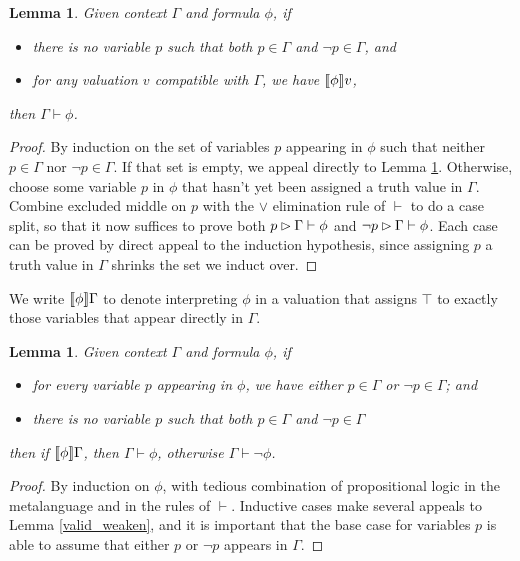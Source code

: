 \documentclass{amsbook}
\newtheorem{lemma}[theorem]{Lemma}
\theoremstyle{definition}
\theoremstyle{remark}
\numberwithin{section}{chapter}
\numberwithin{equation}{chapter}
\begin{document}
\begin{lemma}\label{interp_valid'}
  Given context $\Gamma$ and formula $\phi$, if
  \begin{itemize}
  \item there is no variable $p$ such that both $p \in \Gamma$ and $\neg p \in \Gamma$, and
  \item for any valuation $v$ compatible with $\Gamma$, we have ${\left \llbracket \phi \right \rrbracket}v$,
  \end{itemize}
  then $\Gamma \vdash \phi$.
\end{lemma}
\begin{proof}
  By induction on the set of variables $p$ appearing in $\phi$ such that neither $p \in \Gamma$ nor $\neg p \in \Gamma$.
  If that set is empty, we appeal directly to Lemma \ref{interp_valid''}.
  Otherwise, choose some variable $p$ in $\phi$ that hasn't yet been assigned a truth value in $\Gamma$.
  Combine excluded middle on $p$ with the $\lor$ elimination rule of $\vdash$ to do a case split, so that it now suffices to prove both $p \rhd \Gamma \vdash \phi$ and $\neg p \rhd \Gamma \vdash \phi$.
  Each case can be proved by direct appeal to the induction hypothesis, since assigning $p$ a truth value in $\Gamma$ shrinks the set we induct over.
\end{proof}

We write ${\left \llbracket \phi \right \rrbracket}\Gamma$ to denote interpreting $\phi$ in a valuation that assigns $\top$ to exactly those variables that appear directly in $\Gamma$.

\begin{lemma}\label{interp_valid''}
  Given context $\Gamma$ and formula $\phi$, if
  \begin{itemize}
  \item for every variable $p$ appearing in $\phi$, we have either $p \in \Gamma$ or $\neg p \in \Gamma$; and
  \item there is no variable $p$ such that both $p \in \Gamma$ and $\neg p \in \Gamma$
  \end{itemize}
  then if ${\left \llbracket \phi \right \rrbracket}\Gamma$, then $\Gamma \vdash \phi$, otherwise $\Gamma \vdash \neg \phi$.
\end{lemma}
\begin{proof}
  By induction on $\phi$, with tedious combination of propositional logic in the metalanguage and in the rules of $\vdash$.
  Inductive cases make several appeals to Lemma \ref{valid_weaken}, and it is important that the base case for variables $p$ is able to assume that either $p$ or $\neg p$ appears in $\Gamma$.
\end{proof}
\end{document}
